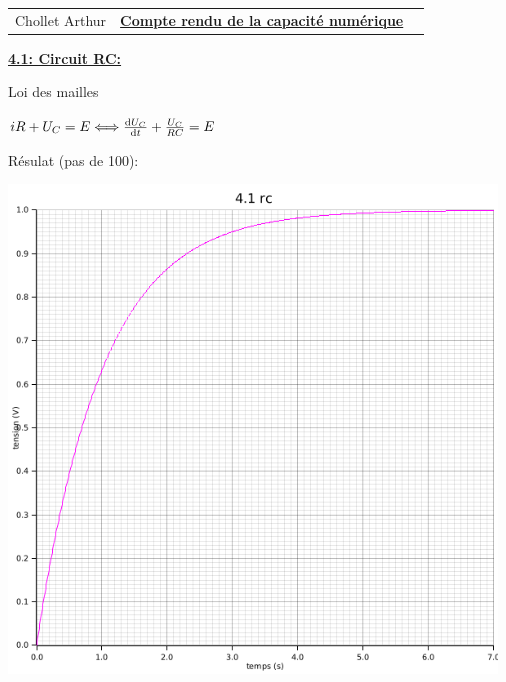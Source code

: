 \documentclass{article}
\newcommand{\expart}[1]
{
    \textbf{\underline{#1:}} \par 
}
\begin{document}
\begin{tabularx}{\linewidth}{XCX}
    Chollet Arthur &\textbf{\underline{Compte rendu de la capacité numérique}}& 
\end{tabularx}

\expart{4.1: Circuit RC}
{
    Loi des mailles

    $iR+U_C=E \Longleftrightarrow  \dv{U_C}{t}+\frac{U_C}{RC}=E$

    Résulat (pas de 100):

    \begin{center}
      \includegraphics[height=35em]{images/rc}
    \end{center}
}

\pagebreak
\end{document}
